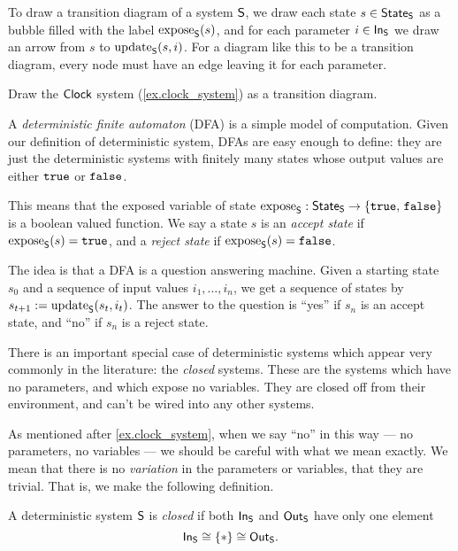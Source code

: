 \documentclass[DynamicalBook]{subfiles}
\begin{document}
\begin{example}
To draw a transition diagram of a system $\mathsf{S}$, we draw each state $s \in
\mathsf{State}_{\mathsf{S}}$ as a bubble filled with the label $\mathrm{expose}_{\mathsf{S}}(s)$, and for each
parameter $i \in \mathsf{In}_{\mathsf{S}}$ we draw an arrow from $s$ to $\mathrm{update}_{\mathsf{S}}(s, i)$. For a
diagram like this to be a transition diagram, every node must have an edge
leaving it for each parameter.
\end{example}

\begin{exercise}
  Draw the $\mathsf{Clock}$ system (\cref{ex.clock_system}) as a transition diagram.
\end{exercise}

\begin{example}\label{ex.dfa}
  A \emph{deterministic finite automaton} (DFA) is a simple model of computation.
  Given our definition of deterministic system, DFAs are easy enough to define:
  they are just the deterministic systems with finitely many states whose output values are either
  $\mathtt{true}$ or $\mathtt{false}$. 

  This means that the exposed variable of state $\mathrm{expose}_{\mathsf{S}} : \mathsf{State}_{\mathsf{S}} \to
  \{\mathtt{true},\, \mathtt{false}\}$ is a boolean valued function. We say a
  state $s$ is an \emph{accept state} if $\mathrm{expose}_{\mathsf{S}}(s) = \mathtt{true}$, and a
  \emph{reject state} if $\mathrm{expose}_{\mathsf{S}}(s) = \mathtt{false}$.

  The idea is that a DFA is a question answering machine. Given a starting state
  $s_0$ and a sequence of input values $i_1, \ldots, i_n$, we get a sequence of
  states by $s_{t+1}:= \mathrm{update}_{\mathsf{S}}(s_t, i_t)$. The answer to the question is
  ``yes'' if $s_n$ is an accept state, and ``no'' if $s_n$ is a reject state.

\end{example}

There is an important special case of deterministic systems which appear very
commonly in the literature: the \emph{closed} systems. These are the systems
which have no parameters, and which expose no variables. They are closed off
from their environment, and can't be wired into any other systems.

As mentioned after \cref{ex.clock_system}, when we say ``no'' in this way --- no parameters, no variables --- we should be
careful with what we mean exactly. We mean that there is no \emph{variation} in
the parameters or variables, that they are trivial. That is, we make the
following definition.
\begin{definition}
  A deterministic system $\mathsf{S}$ is \emph{closed} if both $\mathsf{In}_{\mathsf{S}}$ and
  $\mathsf{Out}_{\mathsf{S}}$ have only one element
  \[\mathsf{In}_{\mathsf{S}}\cong\{*\}\cong\mathsf{Out}_{\mathsf{S}}.\]
\end{definition}
\end{document}
